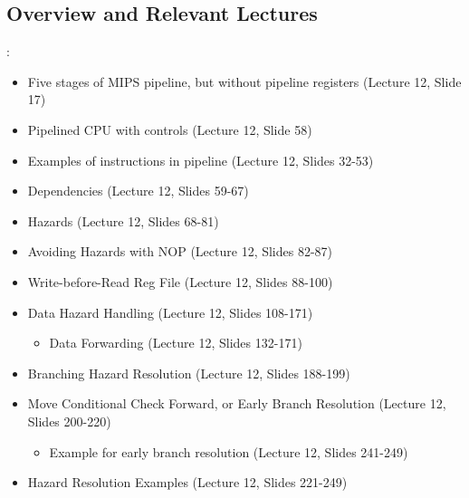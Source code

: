 \documentclass{../slides}
\begin{document}
\subsection{Overview and Relevant Lectures}
\begin{frame}{\secname: \subsecname}
    \begin{itemize}
        \item Five stages of MIPS pipeline, but without pipeline registers (Lecture 12, Slide 17)
        \item Pipelined CPU with controls (Lecture 12, Slide 58)
        \item Examples of instructions in pipeline (Lecture 12, Slides 32-53)
        \item Dependencies (Lecture 12, Slides 59-67)
        \item Hazards (Lecture 12, Slides 68-81)
        \item Avoiding Hazards with NOP (Lecture 12, Slides 82-87)
        \item Write-before-Read Reg File (Lecture 12, Slides 88-100)
        \item Data Hazard Handling (Lecture 12, Slides 108-171)
        \begin{itemize}
            \item Data Forwarding (Lecture 12, Slides 132-171)
        \end{itemize}
        \item Branching Hazard Resolution (Lecture 12, Slides 188-199)
        \item Move Conditional Check Forward, or Early Branch Resolution (Lecture 12, Slides 200-220)
        \begin{itemize}
            \item Example for early branch resolution (Lecture 12, Slides 241-249)
        \end{itemize}
        \item Hazard Resolution Examples (Lecture 12, Slides 221-249)
    \end{itemize}
\end{frame}
\end{document}
